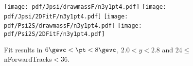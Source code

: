 \begin{figure}[H]
\begin{center}
\texttt{[image: pdf/Jpsi/drawmassF/n3y1pt4.pdf]}
\texttt{[image: pdf/Jpsi/2DFitF/n3y1pt4.pdf]}
\vspace*{-0.5cm}
\texttt{[image: pdf/Psi2S/drawmassF/n3y1pt4.pdf]}
\texttt{[image: pdf/Psi2S/2DFitF/n3y1pt4.pdf]}
\vspace*{-0.5cm}
\end{center}
\caption{Fit results in $6\gevc<\pt<8\gevc$, $2.0<y<2.8$ and 24$\leq$nForwardTracks$<$36.}
\label{Fitn3y1pt4}
\end{figure}
